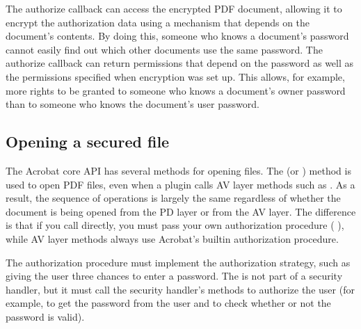 \documentclass[letterpaper,12pt,english,openany,oneside]{sphinxmanual}
\begin{document}
The authorize callback can access the encrypted PDF document, allowing it to encrypt the authorization data using a mechanism that depends on the document’s contents. By doing this, someone who knows a document’s password cannot easily find out which other documents use the same password. The authorize callback can return permissions that depend on the password as well as the permissions specified when encryption was set up. This allows, for example, more rights to be granted to someone who knows a document’s owner password than to someone who knows the document’s user password.


\subsection{Opening a secured file}
\label{\detokenize{Plugins_Security:opening-a-secured-file}}
The Acrobat core API has several methods for opening files. The  (or  ) method is used to open PDF files, even when a plugin calls AV layer methods such as . As a result, the sequence of operations is largely the same regardless of whether the document is being opened from the PD layer or from the AV layer. The difference is that if you call  directly, you must pass your own authorization procedure ( ), while AV layer methods always use Acrobat’s built\sphinxhyphen{}in authorization procedure.

The authorization procedure must implement the authorization strategy, such as giving the user three chances to enter a password. The  is not part of a security handler, but it must call the security handler’s methods to authorize the user (for example, to get the password from the user and to check whether or not the password is valid).
\end{document}
